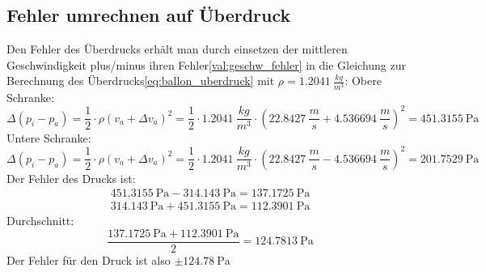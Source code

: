 \documentclass{article}
\begin{document}
        \subsection{Fehler umrechnen auf Überdruck}
            Den Fehler des Überdrucks erhält man durch einsetzen der mittleren Geschwindigkeit plus/minus ihren Fehler\ref{val:geschw_fehler}
            in die Gleichung zur Berechnung des Überdrucks\ref{eq:ballon_uberdruck} mit \(\rho = \SI{1.2041}{\frac{kg}{m^3}}\):
            Obere Schranke:
            \begin{equation}
                \Delta (p_i - p_a) = \frac{1}{2} \cdot \rho {(v_a + \Delta v_a)}^2 = 
                \frac{1}{2} \cdot \SI{1.2041}{\frac{kg}{m^3}} \cdot { \left( \SI{22.8427}{\frac{m}{s}} + \SI{4.536694}{\frac{m}{s}} \right) }^2 = \SI{451.3155}{\pascal}
            \end{equation}
            Untere Schranke:
            \begin{equation}
                \Delta (p_i - p_a) = \frac{1}{2} \cdot \rho {(v_a + \Delta v_a)}^2 = 
                \frac{1}{2} \cdot \SI{1.2041}{\frac{kg}{m^3}} \cdot { \left( \SI{22.8427}{\frac{m}{s}} - \SI{4.536694}{\frac{m}{s}} \right) }^2 = \SI{201.7529}{\pascal}
            \end{equation}
            Der Fehler des Drucks ist:
            \begin{equation}
                \begin{gathered}
                    \SI{451.3155}{\pascal} - \SI{314.143}{\pascal} = \SI{137.1725}{\pascal} \\
                    \SI{314.143}{\pascal} + \SI{451.3155}{\pascal} = \SI{112.3901}{\pascal}
                \end{gathered}
            \end{equation}
            Durchschnitt:
            \begin{equation}
                \frac{ \SI{137.1725}{\pascal} + \SI{112.3901}{\pascal} }{2} = \SI{124.7813}{\pascal}
            \end{equation}
            Der Fehler für den Druck ist also \(\pm \SI{124.78}{\pascal}\)
        
\end{document}

